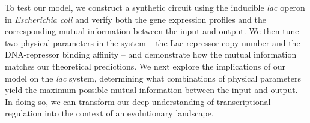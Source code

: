 To test our model, we construct a synthetic circuit using the inducible
\textit{lac} operon in \textit{Escherichia coli} and verify both the gene
expression profiles and the corresponding mutual information between the input
and output. We then tune two physical parameters in the system -- the Lac
repressor copy number and the DNA-repressor binding affinity -- and demonstrate
how the mutual information matches our theoretical predictions. We next explore
the implications of our model on the \textit{lac} system, determining what
combinations of physical parameters yield the maximum possible mutual
information between the input and output. In doing so, we can transform our deep
understanding of transcriptional regulation into the context of an evolutionary
landscape.


%


